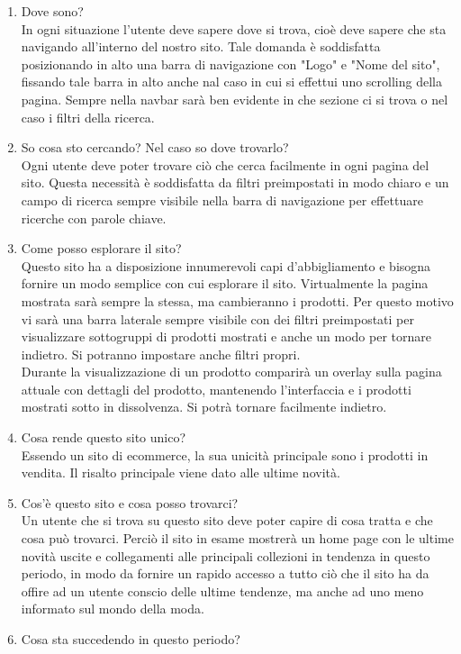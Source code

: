 \documentclass[12pt,a4paper]{report}
\begin{document}
\begin{enumerate}
  \item Dove sono?\\
  In ogni situazione l'utente deve sapere dove si trova, cioè deve sapere che sta navigando all'interno del nostro sito. Tale domanda è soddisfatta posizionando in alto una barra di navigazione con "Logo" e "Nome del sito", fissando tale barra in alto anche nal caso in cui si effettui uno scrolling della pagina. Sempre nella navbar sarà ben evidente in che sezione ci si trova o nel caso i filtri della ricerca.
  \item So cosa sto cercando? Nel caso so dove trovarlo?\\
  Ogni utente deve poter trovare ciò che cerca facilmente in ogni pagina del sito. Questa necessità è soddisfatta da filtri preimpostati in modo chiaro e un campo di ricerca sempre visibile nella barra di navigazione per effettuare ricerche con parole chiave.
  \item Come posso esplorare il sito?\\
  Questo sito ha a disposizione innumerevoli capi d'abbigliamento e bisogna fornire un modo semplice con cui esplorare il sito. Virtualmente la pagina mostrata sarà sempre la stessa, ma cambieranno i prodotti. Per questo motivo vi sarà una barra laterale sempre visibile con dei filtri preimpostati per visualizzare sottogruppi di prodotti mostrati e anche un modo per tornare indietro. Si potranno impostare anche filtri propri.\\
  Durante la visualizzazione di un prodotto comparirà un overlay sulla pagina attuale con dettagli del prodotto, mantenendo l'interfaccia e i prodotti mostrati sotto in dissolvenza. Si potrà tornare facilmente indietro.
  \item Cosa rende questo sito unico?\\
  Essendo un sito di ecommerce, la sua unicità principale sono i prodotti in vendita. Il risalto principale viene dato alle ultime novità.
  \item Cos'è questo sito e cosa posso trovarci?\\
  Un utente che si trova su questo sito deve poter capire di cosa tratta e che cosa può trovarci. Perciò il sito in esame mostrerà un home page con le ultime novità uscite e collegamenti alle principali collezioni in tendenza in questo periodo, in modo da fornire un rapido accesso a tutto ciò che il sito ha da offire ad un utente conscio delle ultime tendenze, ma anche ad uno meno informato sul mondo della moda.
  \item Cosa sta succedendo in questo periodo?\\

\end{enumerate}
\end{document}
